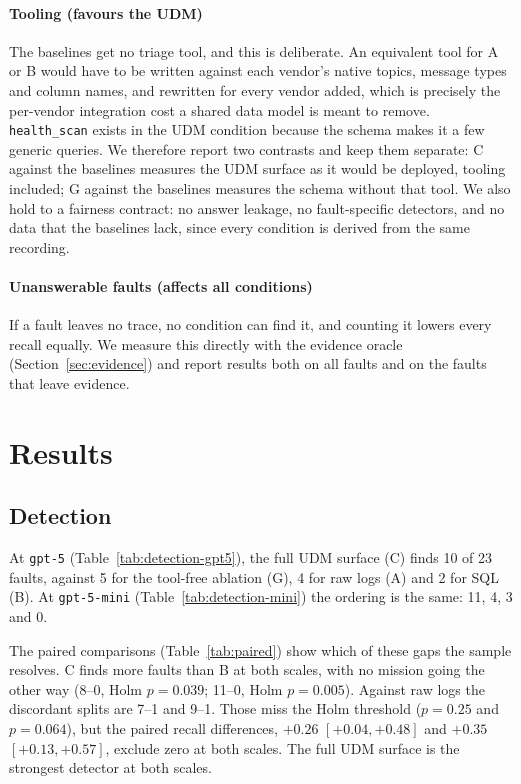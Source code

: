 \documentclass[conference]{IEEEtran}
\newcommand{\condA}{A}
\newcommand{\condB}{B}
\newcommand{\condC}{C}
\newcommand{\condG}{G}
\newcommand{\hs}{\texttt{health\_scan}}
\begin{document}
\paragraph{Tooling (favours the UDM)} The baselines get no triage tool, and this is
deliberate. An equivalent tool for \condA{} or \condB{} would have to be written
against each vendor's native topics, message types and column names, and rewritten
for every vendor added, which is precisely the per-vendor integration cost a shared
data model is meant to remove. \hs{} exists in the UDM condition because the schema
makes it a few generic queries. We therefore report two contrasts and keep them
separate: \condC{} against the baselines measures the UDM surface as it would be
deployed, tooling included; \condG{} against the baselines measures the schema
without that tool. We also hold to a fairness contract: no answer leakage, no
fault-specific detectors, and no data that the baselines lack, since every
condition is derived from the same recording.

\paragraph{Unanswerable faults (affects all conditions)} If a fault leaves no trace,
no condition can find it, and counting it lowers every recall equally. We measure
this directly with the evidence oracle (Section~\ref{sec:evidence}) and report
results both on all faults and on the faults that leave evidence.

\section{Results}

\subsection{Detection}
At \texttt{gpt-5} (Table~\ref{tab:detection-gpt5}), the full UDM surface (\condC)
finds 10 of 23 faults, against 5 for the tool-free ablation (\condG), 4 for raw logs
(\condA) and 2 for SQL (\condB). At \texttt{gpt-5-mini}
(Table~\ref{tab:detection-mini}) the ordering is the same: 11, 4, 3 and 0.



The paired comparisons (Table~\ref{tab:paired}) show which of these gaps the sample
resolves. \condC{} finds more faults than \condB{} at both scales, with no mission
going the other way (8--0, Holm $p=0.039$; 11--0, Holm $p=0.005$). Against raw logs
the discordant splits are 7--1 and 9--1. Those miss the Holm threshold ($p=0.25$ and
$p=0.064$), but the paired recall differences, $+0.26$ $[+0.04, +0.48]$ and $+0.35$
$[+0.13, +0.57]$, exclude zero at both scales. The full UDM surface is the
strongest detector at both scales.
\end{document}
